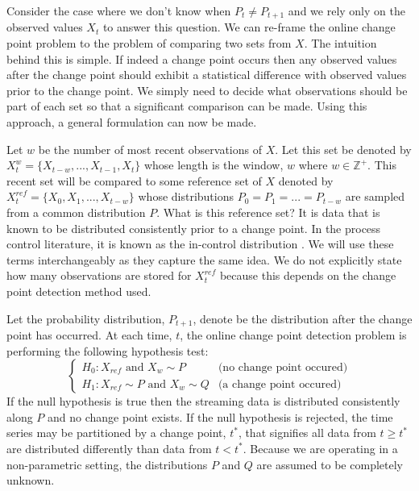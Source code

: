 Consider the case where we don't know when $P_t \neq P_{t+1}$ and we rely only on the observed values $X_t$ to answer this question. We can re-frame the online change point problem to the problem of comparing two sets from $X$. The intuition behind this is simple. If indeed a change point occurs then any observed values after the change point should exhibit a statistical difference with observed values prior to the change point. We simply need to decide what observations should be part of each set so that a significant comparison can be made. Using this approach, a general formulation can now be made.

Let $w$ be the number of most recent observations of $X$. Let this set be denoted by $X_t^w = \{X_{t-w},...,X_{t-1}, X_t\}$ whose length is the window, $w$ where $ w \in \mathbb{Z}^+$. This recent set will be compared to some reference set of $X$ denoted by $X_t^{ref}= \{X_0, X_1, ..., X_{t-w} \}$ whose distributions $P_0 = P_1=...= P_{t-w}$ are sampled from a common distribution $P$. What is this reference set? It is data that is known to be distributed consistently prior to a change point. In the process control literature, it is known as the in-control distribution \cite{bersimis2007multivariate}. We will use these terms interchangeably as they capture the same idea. We do not explicitly state how many observations are stored for $X_t^{ref}$ because this depends on the change point detection method used. 

Let the probability distribution, $P_{t+1}$, denote be the distribution after the change point has occurred. At each time, $t$, the online change point detection problem is performing the following hypothesis test:
\begin{equation}
\label{formula_cpd}
  \begin{cases}
    H_0: X_{ref} \text{ and } X_w \sim  P & \text{(no change point occured)} \\
    H_1: X_{ref} \sim P \text{ and }  X_w  \sim Q & \text{(a change point occured)}
  \end{cases}
\end{equation}
If the null hypothesis is true then the streaming data is distributed consistently along $P$ and no change point exists. If the null hypothesis is rejected, the time series may be partitioned by a change point, $t^*$, that signifies all data from $t \geq t^*$ are distributed differently than data from $t<t^*$. Because we are operating in a non-parametric setting, the distributions $P$ and $Q$ are assumed to be completely unknown. 

